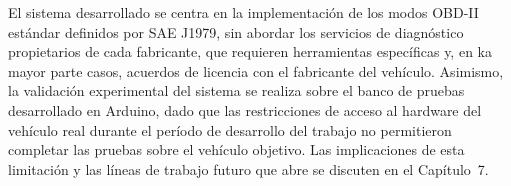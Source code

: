 El sistema desarrollado se centra en la implementación de los modos OBD-II estándar definidos por SAE J1979, sin abordar los servicios de diagnóstico propietarios de cada fabricante, que requieren herramientas específicas y, en ka mayor parte casos, acuerdos de licencia con el fabricante del vehículo. Asimismo, la validación experimental del sistema se realiza sobre el banco de pruebas desarrollado en Arduino, dado que las restricciones de acceso al hardware del vehículo real durante el período de desarrollo del trabajo no permitieron completar las pruebas sobre el vehículo objetivo. Las implicaciones de esta limitación y las líneas de trabajo futuro que abre se discuten en el Capítulo~7.
